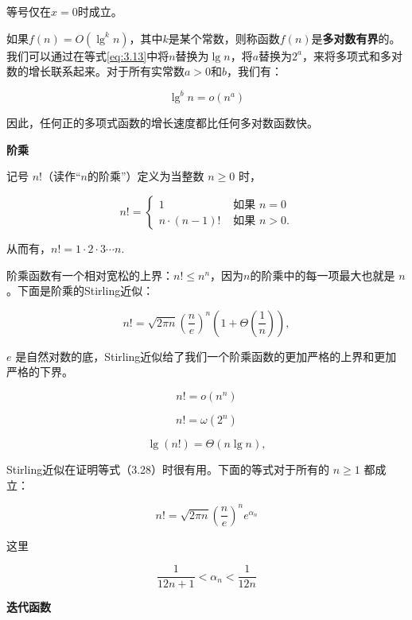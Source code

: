 \documentclass[lang=cn,newtx,10pt,scheme=chinese]{elegantbook}
\begin{document}
等号仅在$x=0$时成立。

如果$f(n)=O(\lg^kn)$，其中$k$是某个常数，则称函数$f(n)$是\textbf{多对数有界}的。我们可以通过在等式\eqref{eq:3.13}中将$n$替换为$\lg n$，将$a$替换为$2^a$，来将多项式和多对数的增长联系起来。对于所有实常数$a>0$和$b$，我们有：

\begin{equation}\label{eq:3.24}
\lg ^b n=o(n^a)
\end{equation}

因此，任何正的多项式函数的增长速度都比任何多对数函数快。

\textbf{阶乘}

记号 $n!$（读作``$n$的阶乘''）定义为当整数 $n \geq 0$ 时，

$$
n != \begin{cases}1 & \text { 如果 } n=0 \\ n \cdot(n-1) ! & \text { 如果 } n>0 .\end{cases}
$$

从而有，$n !=1 \cdot 2 \cdot 3 \cdots n$.

阶乘函数有一个相对宽松的上界：$n ! \leq n^n$，因为$n$的阶乘中的每一项最大也就是 $n$。下面是阶乘的Stirling近似：

\begin{equation}
n !=\sqrt{2 \pi n}(\frac{n}{e})^n(1+\Theta(\frac{1}{n})),
\end{equation}

$e$ 是自然对数的底，Stirling近似给了我们一个阶乘函数的更加严格的上界和更加严格的下界。

\begin{equation}
n!=o(n^n)
\end{equation}

\begin{equation}
n!=\omega(2^n)
\end{equation}

\begin{equation}
\lg(n!)=\Theta(n\lg n),
\end{equation}

Stirling近似在证明等式（3.28）时很有用。下面的等式对于所有的 $n \geq 1$ 都成立：

\begin{equation}
n !=\sqrt{2 \pi n}(\frac{n}{e})^n e^{\alpha_n}
\end{equation}

这里

$$
\frac{1}{12 n+1}<\alpha_n<\frac{1}{12 n}
$$

\textbf{迭代函数}
\end{document}
